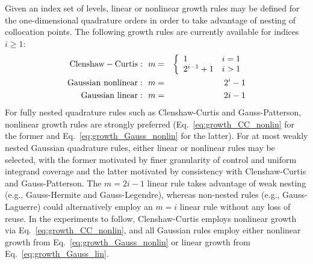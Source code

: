 Given an index set of levels, linear or nonlinear growth rules may be
defined for the one-dimensional quadrature orders in order to take
advantage of nesting of collocation points.  The following growth rules
are currently available for indices $i \geq 1$:
\begin{eqnarray}
{\rm Clenshaw-Curtis:}~~m &=& 
\left\{ \begin{array}{ll}
         1       & i=1 \\
         2^{i-1} + 1 & i > 1 
        \end{array} \right.    \label{eq:growth_CC_nonlin} \\
{\rm Gaussian~nonlinear:}~~m &=& 2^i - 1 \label{eq:growth_Gauss_nonlin} \\
{\rm Gaussian~linear:}   ~~m &=& 2 i - 1 \label{eq:growth_Gauss_lin}
\end{eqnarray}
For fully nested quadrature rules such as Clenshaw-Curtis and
Gauss-Patterson, nonlinear growth rules are strongly preferred
(Eq.~\ref{eq:growth_CC_nonlin} for the former and
Eq.~\ref{eq:growth_Gauss_nonlin} for the latter).  For at most weakly
nested Gaussian quadrature rules, either linear or nonlinear rules may
be selected, with the former motivated by finer granularity of control
and uniform integrand coverage and the latter motivated by consistency
with Clenshaw-Curtis and Gauss-Patterson.  The $m = 2i - 1$ linear
rule takes advantage of weak nesting (e.g., Gauss-Hermite and
Gauss-Legendre), whereas non-nested rules (e.g., Gauss-Laguerre) could
alternatively employ an $m = i$ linear rule without any loss of reuse.
In the experiments to follow, Clenshaw-Curtis employs nonlinear growth
via Eq.~\ref{eq:growth_CC_nonlin}, and all Gaussian rules employ
either nonlinear growth from Eq.~\ref{eq:growth_Gauss_nonlin} or
linear growth from Eq.~\ref{eq:growth_Gauss_lin}.

